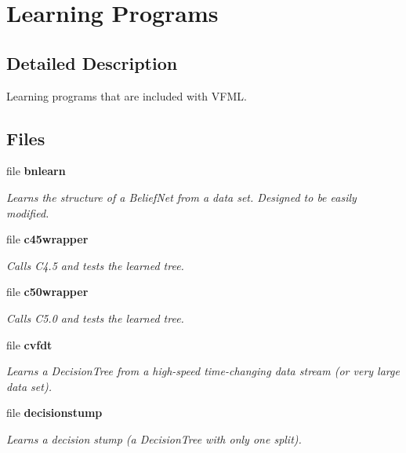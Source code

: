 \section{Learning Programs}
\label{group__Learners}


\subsection{Detailed Description}
Learning programs that are included with VFML. 

\subsection*{Files}
\begin{CompactItemize}
\item 
file {\bf bnlearn}
\begin{CompactList}\small\item\em Learns the structure of a Belief\-Net from a data set. Designed to be easily modified. \item\end{CompactList}

\item 
file {\bf c45wrapper}
\begin{CompactList}\small\item\em Calls C4.5 and tests the learned tree. \item\end{CompactList}

\item 
file {\bf c50wrapper}
\begin{CompactList}\small\item\em Calls C5.0 and tests the learned tree. \item\end{CompactList}

\item 
file {\bf cvfdt}
\begin{CompactList}\small\item\em Learns a Decision\-Tree from a high-speed time-changing data stream (or very large data set). \item\end{CompactList}

\item 
file {\bf decisionstump}
\begin{CompactList}\small\item\em Learns a decision stump (a Decision\-Tree with only one split). \item\end{CompactList}


\end{CompactItemize}
